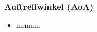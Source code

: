 \begin{frame}
\frametitle{Auftreffwinkel (AoA)}

\begin{itemize}
  \item mmmm
\end{itemize}
\end{frame}
